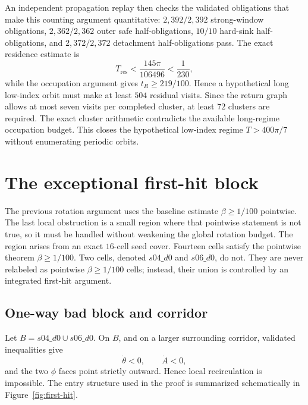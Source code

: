 \documentclass[11pt]{article}
\begin{document}
An independent propagation replay then checks the validated obligations that make this counting argument quantitative: $2{,}392/2{,}392$ strong-window obligations, $2{,}362/2{,}362$ outer safe half-obligations, $10/10$ hard-sink half-obligations, and $2{,}372/2{,}372$ detachment half-obligations pass. The exact residence estimate is
\[
T_{\mathrm{res}}<\frac{145\pi}{106496}<\frac1{230},
\]
while the occupation argument gives $t_R\ge219/100$. Hence a hypothetical long low-index orbit must make at least $504$ residual visits. Since the return graph allows at most seven visits per completed cluster, at least $72$ clusters are required. The exact cluster arithmetic contradicts the available long-regime occupation budget. This closes the hypothetical low-index regime $T>400\pi/7$ without enumerating periodic orbits.

\section{The exceptional first-hit block}
The previous rotation argument uses the baseline estimate $\beta\ge1/100$ pointwise. The last local obstruction is a small region where that pointwise statement is not true, so it must be handled without weakening the global rotation budget. The region arises from an exact $16$-cell seed cover. Fourteen cells satisfy the pointwise theorem $\beta\ge1/100$. Two cells, denoted $s04\_d0$ and $s06\_d0$, do not. They are never relabeled as pointwise $\beta\ge1/100$ cells; instead, their union is controlled by an integrated first-hit argument.

\subsection{One-way bad block and corridor}
Let $B=s04\_d0\cup s06\_d0$. On $B$, and on a larger surrounding corridor, validated inequalities give
\[
\dot\theta<0,\qquad \dot A<0,
\]
and the two $\phi$ faces point strictly outward. Hence local recirculation is impossible. The entry structure used in the proof is summarized schematically in Figure~\ref{fig:first-hit}.
\end{document}
